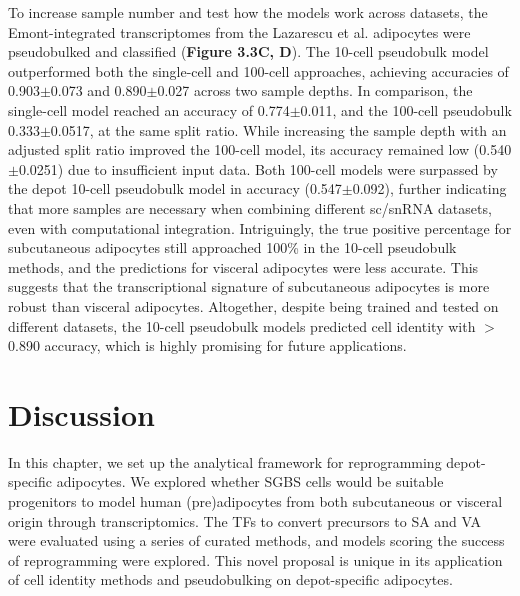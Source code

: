 To increase sample number and test how the models work across datasets, the Emont-integrated transcriptomes from the Lazarescu et al. adipocytes were pseudobulked and classified (\textbf{Figure 3.3C, D}). The 10-cell pseudobulk model outperformed both the single-cell and 100-cell approaches, achieving accuracies of 0.903$\pm$0.073 and 0.890$\pm$0.027 across two sample depths. In comparison, the single-cell model reached an accuracy of 0.774$\pm$0.011, and the 100-cell pseudobulk 0.333$\pm$0.0517, at the same split ratio. While increasing the sample depth with an adjusted split ratio improved the 100-cell model, its accuracy remained low (0.540$\pm$0.0251) due to insufficient input data. Both 100-cell models were surpassed by the depot 10-cell pseudobulk model in accuracy (0.547$\pm$0.092), further indicating that more samples are necessary when combining different sc/snRNA datasets, even with computational integration. Intriguingly, the true positive percentage for subcutaneous adipocytes still approached 100\% in the 10-cell pseudobulk methods, and the predictions for visceral adipocytes were less accurate. This suggests that the transcriptional signature of subcutaneous adipocytes is more robust than visceral adipocytes. Altogether, despite being trained and tested on different datasets, the 10-cell pseudobulk models predicted cell identity with $>$0.890 accuracy, which is highly promising for future applications.

\section{Discussion}

In this chapter, we set up the analytical framework for reprogramming depot-specific adipocytes. We explored whether SGBS cells would be suitable progenitors to model human (pre)adipocytes from both subcutaneous or visceral origin through transcriptomics. The TFs to convert precursors to SA and VA were evaluated using a series of curated methods, and models scoring the success of reprogramming were explored. This novel proposal is unique in its application of cell identity methods and pseudobulking on depot-specific adipocytes.   

